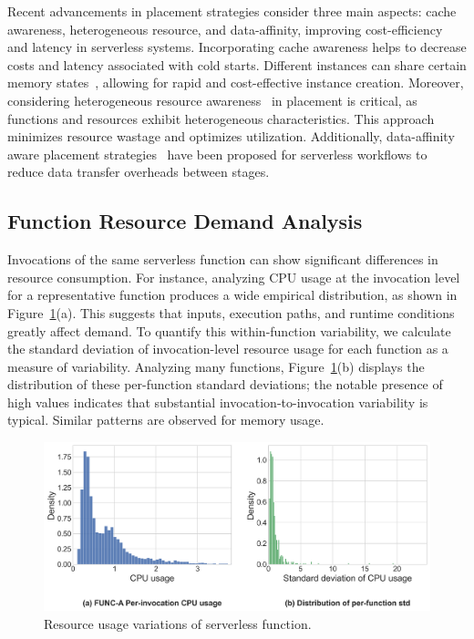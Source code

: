 Recent advancements in placement strategies consider three main aspects: cache awareness,
heterogeneous resource, and data-affinity, improving cost-efficiency and latency in serverless systems.
Incorporating cache awareness helps to decrease costs and latency associated with cold starts.
Different instances can share certain memory states~\cite{SOCK_OakesYZHHAA18, li2022help},
allowing for rapid and cost-effective instance creation.
Moreover, considering heterogeneous resource awareness~\cite{RoyPT22, DuLJXZC22} in placement is critical,
as functions and resources exhibit heterogeneous characteristics.
This approach minimizes resource wastage and optimizes utilization.
Additionally, data-affinity aware placement strategies~\cite{Wukong_CarverZWAWC20, ORION_MahgoubYSECB22}
have been proposed for serverless workflows to reduce data transfer overheads between stages.


\subsection{Function Resource Demand Analysis}
\label{sec:background:demand-analysis}

Invocations of the same serverless function can show significant differences in
resource consumption. For instance, analyzing CPU usage at the invocation level
for a representative function produces a wide empirical distribution, as shown in
Figure~\ref{fig:usage_variation}(a). This suggests that inputs, execution paths, and
runtime conditions greatly affect demand. To quantify this within-function variability,
we calculate the standard deviation of invocation-level resource usage for each function
as a measure of variability. Analyzing many functions, Figure~\ref{fig:usage_variation}(b)
displays the distribution of these per-function standard deviations; the notable presence
of high values indicates that substantial invocation-to-invocation variability is typical.
Similar patterns are observed for memory usage.

\begin{figure}[t]
  \centering
  \includegraphics[width=1.0\linewidth]{figures/background/usage_variation.png}
  \caption{Resource usage variations of serverless function.}
  \label{fig:usage_variation}
\end{figure}

